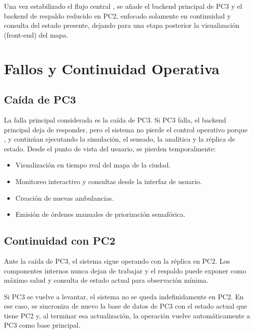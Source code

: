 \documentclass[12pt, a4paper]{article}
\let\oldtexttt\texttt
\renewcommand{\texttt}[1]{\oldtexttt{\seqsplit{#1}}}
\begin{document}
Una vez estabilizado el flujo central \texttt{PC0-PC1-PC2}, se añade el backend principal de PC3 y el backend de respaldo reducido en PC2, enfocado solamente en continuidad y consulta del estado presente, dejando para una etapa posterior la visualización (front-end) del mapa.

\section{Fallos y Continuidad Operativa}

\subsection{Caída de PC3}

La falla principal considerada es la caída de PC3. Si PC3 falla, el backend principal deja de responder, pero el sistema no pierde el control operativo porque \texttt{PC0}, \texttt{PC1} y \texttt{PC2} continúan ejecutando la simulación, el sensado, la analítica y la réplica de estado. Desde el punto de vista del usuario, se pierden temporalmente:

\begin{itemize}
    \item Visualización en tiempo real del mapa de la ciudad.
    \item Monitoreo interactivo y consultas desde la interfaz de usuario.
    \item Creación de nuevas ambulancias.
    \item Emisión de órdenes manuales de priorización semafórica.
\end{itemize}

\subsection{Continuidad con PC2}

Ante la caída de PC3, el sistema sigue operando con la réplica en PC2. Los componentes internos nunca dejan de trabajar y el respaldo puede exponer como máximo salud y consulta de estado actual para observación mínima.

Si PC3 se vuelve a levantar, el sistema no se queda indefinidamente en PC2. En ese caso, se sincroniza de nuevo la base de datos de PC3 con el estado actual que tiene PC2 y, al terminar esa actualización, la operación vuelve automáticamente a PC3 como base principal.
\end{document}
